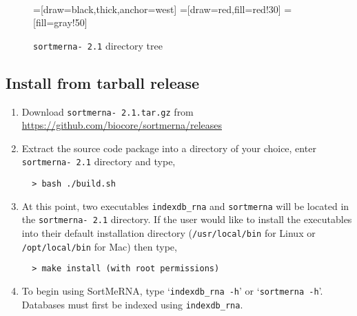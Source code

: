 \documentclass[10pt,a4paper]{article}
\begin{document}
\begin{figure}[here!]
\caption{\texttt{sortmerna- 2.1} directory tree}~\\
\centering
{}=[draw=black,thick,anchor=west]
=[draw=red,fill=red!30]
=[fill=gray!50]
\label{fig:systemtree}
\end{figure}

\subsection{Install from tarball release}
\label{sec:install}

\begin{enumerate}
 \item Download \texttt{sortmerna- 2.1.tar.gz} from \url{https://github.com/biocore/sortmerna/releases}
 \item Extract the source code package into a directory of your choice, enter \texttt{sortmerna- 2.1} directory and type,
  \begin{verbatim}
  > bash ./build.sh
 \end{verbatim}
  \item At this point, two executables \texttt{indexdb\_rna} and \texttt{sortmerna} will be located
 in the \texttt{sortmerna- 2.1} directory. 
 If the user would like to install the executables into their default installation directory (\texttt{/usr/local/bin} for Linux or \texttt{/opt/local/bin} for Mac) then type,
 \begin{verbatim}
  > make install (with root permissions)
 \end{verbatim}
 \item To begin using SortMeRNA, type `\texttt{indexdb\_rna -h}' or `\texttt{sortmerna -h}'. Databases must first be indexed using \texttt{indexdb\_rna}.
\end{enumerate}
\end{document}
